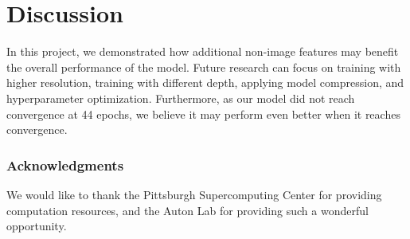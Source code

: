 \documentclass{article}
\begin{document}
\section{Discussion}
\label{Conc}
In this project, we demonstrated how additional non-image features may benefit the overall performance of the model.
Future research can focus on training with higher resolution, training with different depth, applying model compression, and hyperparameter optimization. Furthermore, as our model did not reach convergence at 44 epochs, we believe it may perform even better when it reaches convergence. 

\subsubsection*{Acknowledgments}

We would like to thank the Pittsburgh Supercomputing Center for providing computation resources, and the Auton Lab for providing such a wonderful opportunity.








\end{document}
